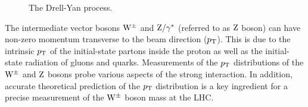 \begin{figure}[hbtp] %
 \centering
 \caption{The Drell-Yan process.} \label{fig:DYdiagram}
\end{figure}
The intermediate vector bosons $\mathrm{W}^{\pm}$ and $\mathrm{Z}/\gamma^*$ (referred to as 
$\mathrm{Z}$ boson) can have non-zero momentum transverse to the beam direction 
($p_{\mathrm{T}}$). This is due to the intrinsic $p_{\mathrm{T}}$ of the initial-state partons 
inside the proton as well as the initial-state radiation of gluons and quarks. 
Measurements of the $p_{\mathrm{T}}$ distributions of the $\mathrm{W}^{\pm}$ and $\mathrm{Z}$ bosons probe 
various aspects of the strong interaction. In addition, accurate theoretical 
prediction of the $p_{\mathrm{T}}$ distribution is a key ingredient for a precise 
measurement of the $\mathrm{W}^{\pm}$ boson mass at the LHC.

